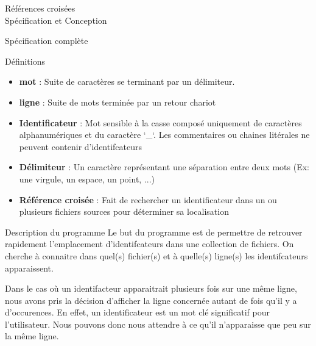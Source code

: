 \documentclass{article}
\begin{document}
\begin{center} 
\Huge{Références croisées \\ Spécification et Conception}
\end{center}



\begin{section}{Spécification complète}


  \begin{subsection}{Définitions}

    \begin{itemize}

      \item \textbf{mot} : Suite de caractères se terminant par un délimiteur.

      \item \textbf{ligne} : Suite de mots terminée par un retour chariot

      \item \textbf{Identificateur} : Mot sensible à la casse composé uniquement de caractères alphanumériques et du caractère `\_`. 
				      Les commentaires ou chaines litérales ne peuvent contenir d'identifcateurs

      \item \textbf{Délimiteur} : Un caractère représentant une séparation entre deux mots (Ex: une virgule, un espace, un point, ...) 

      \item \textbf{Référence croisée} : Fait de rechercher un identificateur dans un ou plusieurs fichiers sources pour déterminer sa localisation
    \end{itemize}

  \end{subsection}


  \begin{subsection}{Description du programme}
    Le but du programme est de permettre de retrouver rapidement l'emplacement d'identifcateurs dans une collection de fichiers.
    On cherche à connaitre dans quel(s) fichier(s) et à quelle(s) ligne(s) les identifcateurs apparaissent.
    
    Dans le cas où un identifacteur apparaitrait plusieurs fois sur une même ligne, nous avons pris la décision d'afficher
    la ligne concernée autant de fois qu'il y a d'occurences. En effet, un identificateur est un mot clé significatif pour l'utilisateur.
    Nous pouvons donc nous attendre à ce qu'il n'apparaisse que peu sur la même ligne.
    

\end{subsection}
\end{section}
\end{document}
